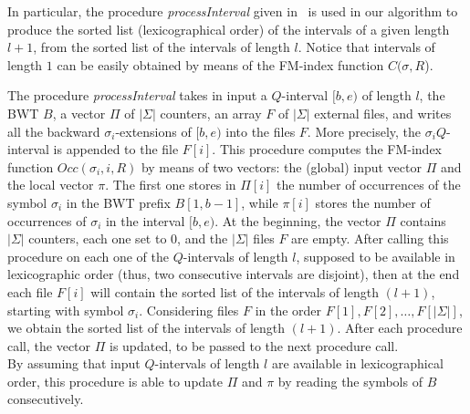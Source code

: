 \documentclass[runningheads,envcountsame,a4paper]{llncs}
\newcommand{\notaestesa}[2]{%
  {\sffamily {\bfseries #1}{\footnotesize #2}}%
  \marginpar{\framebox{\Large *}}%
}
\begin{document}
\begin{comment}
In particular, the procedure \emph{processInterval} given
in~\cite{Cox2012} is used in our algorithm to produce the sorted list
(lexicographical order) of the intervals of a given length $l$, from the
sorted list of the intervals of length $l-1$ (intervals of length $1$
can be easily obtained by means of the FM-index function $C$).
\notaestesa{Raffa}{Togliere lo pseudocodice della procedura processInterval: \'e della Rosone e non nostro.}.
\notaestesa{GDV}{ Concordo di togliere lo pseudocodice.
Bisogna dire però cosa calcola la procedura}

We extend the procedure \emph{processInterval} to
\emph{processLinkedInterval}, \notaestesa{GDV}{ joined $\rightarrow$ linked?} where we produce not only the $Q$-intervals on $B$, but also the linked
$rev(Q)$-intervals on $B'$.
\end{comment}

In particular, the procedure \emph{processInterval} given
in~\cite{Cox2012} is used in our algorithm to produce the sorted list
(lexicographical order) of the intervals of a given length $l+1$, from the
sorted list of the intervals of length $l$. Notice that intervals of length $1$
can be easily obtained by means of the FM-index function $C(\sigma, R$).

The procedure \emph{processInterval} takes in input a $Q$-interval $[b,e)$ of length $l$, the BWT $B$, a vector $\Pi$ of $|\Sigma|$ counters, an array $F$ of $|\Sigma|$ external files, and writes all the backward $\sigma_i$-extensions of $[b,e)$ into the files $F$. More precisely, the $\sigma_i Q$-interval is appended to the file $F[i]$. This procedure computes the FM-index function $Occ(\sigma_i, i, R)$ by means of two vectors: the (global) input vector $\Pi$ and the local vector $\pi$. The first one stores in $\Pi[i]$ the number of occurrences of  the symbol $\sigma_i$ in the BWT prefix $B[1,b-1]$, while $\pi[i]$ stores the number of occurrences of $\sigma_i$ in the interval $[b,e)$. At the beginning, the vector $\Pi$ contains $|\Sigma|$ counters, each one set to $0$, and the $|\Sigma|$ files $F$ are empty.
After calling this procedure on each one of the $Q$-intervals of length $l$, supposed to be available in lexicographic order (thus, two consecutive intervals are disjoint), then  at the end each file $F[i]$ will contain the sorted list of the intervals of length $(l+1)$, starting with symbol $\sigma_i$. Considering files $F$ in the order $F[1], F[2], \ldots ,F[|\Sigma|]$, we obtain the sorted list of the intervals of length $(l+1)$. After each procedure call, the vector $\Pi$ is updated, to be passed to the next procedure call.\\
By assuming that input $Q$-intervals of length $l$ are available in lexicographical order, this procedure is able to update $\Pi$ and $\pi$ by reading the symbols of $B$ consecutively.
\end{document}

